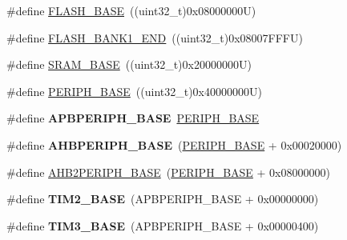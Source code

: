 \begin{DoxyCompactItemize}
\item 
\#define \hyperlink{group___peripheral__memory__map_ga23a9099a5f8fc9c6e253c0eecb2be8db}{F\+L\+A\+S\+H\+\_\+\+B\+A\+SE}~((uint32\+\_\+t)0x08000000\+U)
\item 
\#define \hyperlink{group___peripheral__memory__map_ga443a2786535d83e32dfdc2b29e379332}{F\+L\+A\+S\+H\+\_\+\+B\+A\+N\+K1\+\_\+\+E\+ND}~((uint32\+\_\+t)0x08007\+F\+F\+F\+U)
\item 
\#define \hyperlink{group___peripheral__memory__map_ga05e8f3d2e5868754a7cd88614955aecc}{S\+R\+A\+M\+\_\+\+B\+A\+SE}~((uint32\+\_\+t)0x20000000\+U)
\item 
\#define \hyperlink{group___peripheral__memory__map_ga9171f49478fa86d932f89e78e73b88b0}{P\+E\+R\+I\+P\+H\+\_\+\+B\+A\+SE}~((uint32\+\_\+t)0x40000000\+U)
\item 
\mbox{\label{group___peripheral__memory__map_gac85f31889eb6a3f651b563bbc7131f91}} 
\#define {\bfseries A\+P\+B\+P\+E\+R\+I\+P\+H\+\_\+\+B\+A\+SE}~\hyperlink{group___peripheral__memory__map_ga9171f49478fa86d932f89e78e73b88b0}{P\+E\+R\+I\+P\+H\+\_\+\+B\+A\+SE}
\item 
\mbox{\label{group___peripheral__memory__map_ga92eb5d49730765d2abd0f5b09548f9f5}} 
\#define {\bfseries A\+H\+B\+P\+E\+R\+I\+P\+H\+\_\+\+B\+A\+SE}~(\hyperlink{group___peripheral__memory__map_ga9171f49478fa86d932f89e78e73b88b0}{P\+E\+R\+I\+P\+H\+\_\+\+B\+A\+SE} + 0x00020000)
\item 
\#define \hyperlink{group___peripheral__memory__map_gaeedaa71d22a1948492365e2cd26cfd46}{A\+H\+B2\+P\+E\+R\+I\+P\+H\+\_\+\+B\+A\+SE}~(\hyperlink{group___peripheral__memory__map_ga9171f49478fa86d932f89e78e73b88b0}{P\+E\+R\+I\+P\+H\+\_\+\+B\+A\+SE} + 0x08000000)
\item 
\mbox{\label{group___peripheral__memory__map_ga00d0fe6ad532ab32f0f81cafca8d3aa5}} 
\#define {\bfseries T\+I\+M2\+\_\+\+B\+A\+SE}~(A\+P\+B\+P\+E\+R\+I\+P\+H\+\_\+\+B\+A\+SE + 0x00000000)
\item 
\mbox{\label{group___peripheral__memory__map_gaf0c34a518f87e1e505cd2332e989564a}} 
\#define {\bfseries T\+I\+M3\+\_\+\+B\+A\+SE}~(A\+P\+B\+P\+E\+R\+I\+P\+H\+\_\+\+B\+A\+SE + 0x00000400)
\item 
\mbox{\label{group___peripheral__memory__map_ga862855347d6e1d92730dfe17ee8e90b8}} 

\end{DoxyCompactItemize}
